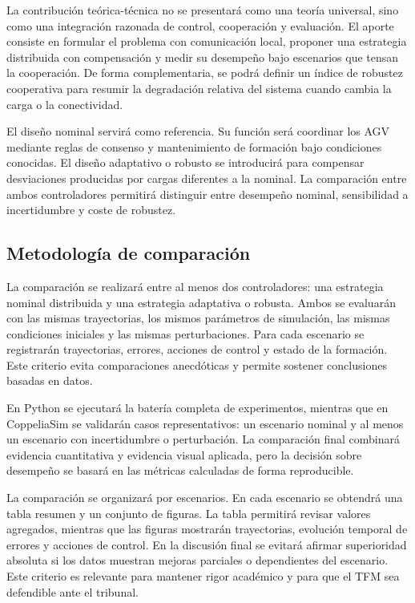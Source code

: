 \documentclass[12pt,a4paper]{article}
\begin{document}
La contribución teórica-técnica no se presentará como una teoría universal, sino como una integración razonada de control, cooperación y evaluación. El aporte consiste en formular el problema con comunicación local, proponer una estrategia distribuida con compensación y medir su desempeño bajo escenarios que tensan la cooperación. De forma complementaria, se podrá definir un índice de robustez cooperativa para resumir la degradación relativa del sistema cuando cambia la carga o la conectividad.

El diseño nominal servirá como referencia. Su función será coordinar los AGV mediante reglas de consenso y mantenimiento de formación bajo condiciones conocidas. El diseño adaptativo o robusto se introducirá para compensar desviaciones producidas por cargas diferentes a la nominal. La comparación entre ambos controladores permitirá distinguir entre desempeño nominal, sensibilidad a incertidumbre y coste de robustez.

\subsection{Metodología de comparación}

La comparación se realizará entre al menos dos controladores: una estrategia nominal distribuida y una estrategia adaptativa o robusta. Ambos se evaluarán con las mismas trayectorias, los mismos parámetros de simulación, las mismas condiciones iniciales y las mismas perturbaciones. Para cada escenario se registrarán trayectorias, errores, acciones de control y estado de la formación. Este criterio evita comparaciones anecdóticas y permite sostener conclusiones basadas en datos.

En Python se ejecutará la batería completa de experimentos, mientras que en CoppeliaSim se validarán casos representativos: un escenario nominal y al menos un escenario con incertidumbre o perturbación. La comparación final combinará evidencia cuantitativa y evidencia visual aplicada, pero la decisión sobre desempeño se basará en las métricas calculadas de forma reproducible.

La comparación se organizará por escenarios. En cada escenario se obtendrá una tabla resumen y un conjunto de figuras. La tabla permitirá revisar valores agregados, mientras que las figuras mostrarán trayectorias, evolución temporal de errores y acciones de control. En la discusión final se evitará afirmar superioridad absoluta si los datos muestran mejoras parciales o dependientes del escenario. Este criterio es relevante para mantener rigor académico y para que el TFM sea defendible ante el tribunal.
\end{document}
